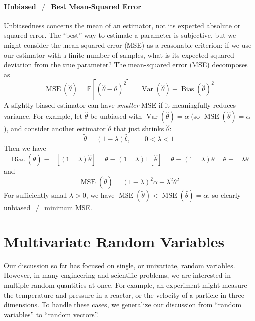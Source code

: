 \paragraph*{Unbiased \texorpdfstring{$\neq$}{≠} Best Mean-Squared Error} Unbiasedness concerns the mean of an estimator, not its expected absolute or squared error. The ``best'' way to estimate a parameter is subjective, but we might consider the mean-squared error (MSE) as a reasonable criterion: if we use our estimator with a finite number of samples, what is its expected squared deviation from the true parameter? The mean-squared error (MSE) decomposes as
\begin{equation}
    \operatorname{MSE}(\hat\theta)
    = \mathbb{E}\!\left[(\hat\theta-\theta)^2\right]
    = \operatorname{Var}(\hat\theta) + \operatorname{Bias}(\hat\theta)^2
\end{equation}
A slightly biased estimator can have \emph{smaller} MSE if it meaningfully reduces variance. For example, let $\hat\theta$ be unbiased with $\operatorname{Var}(\hat\theta)=\alpha$ (so $\operatorname{MSE}(\hat\theta)=\alpha$), and consider another estimator $\tilde\theta$ that just shrinks $\hat\theta$:
\begin{equation}
    \tilde\theta=(1-\lambda)\hat\theta,\qquad 0<\lambda<1
\end{equation}
Then we have
\begin{equation}
    \operatorname{Bias}(\tilde\theta)
    = \mathbb{E}[(1-\lambda)\hat\theta] - \theta
    = (1-\lambda)\mathbb{E}[\hat\theta] - \theta
    = (1-\lambda)\theta - \theta
    = -\lambda\theta
\end{equation}
and
\begin{equation}
    \operatorname{MSE}(\tilde\theta)
    = (1-\lambda)^2 \alpha + \lambda^2 \theta^2
\end{equation}
For sufficiently small $\lambda>0$, we have $\operatorname{MSE}(\tilde\theta) < \operatorname{MSE}(\hat\theta)=\alpha$, so clearly unbiased $\neq$ minimum MSE.


\section{Multivariate Random Variables}
Our discussion so far has focused on single, or univariate, random variables. However, in many engineering and scientific problems, we are interested in multiple random quantities at once. For example, an experiment might measure the temperature and pressure in a reactor, or the velocity of a particle in three dimensions. To handle these cases, we generalize our discussion from ``random variables'' to ``random vectors''.

